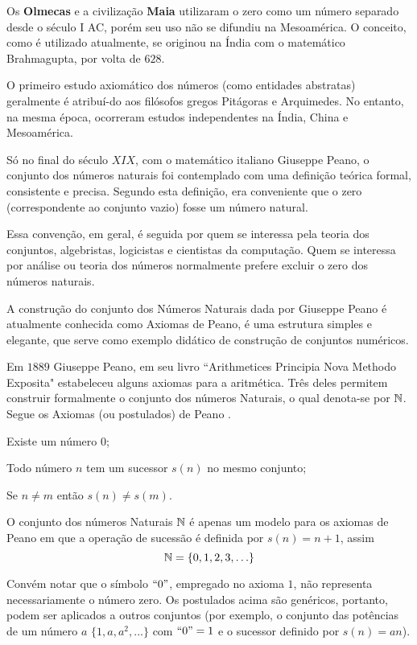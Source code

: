 \documentclass[glenn,refnum,codigo]{Estilo}
\begin{document}
Os \textbf{Olmecas} e a civilização \textbf{Maia} utilizaram o
zero como um número separado desde o século I AC, porém seu uso não
se difundiu na Mesoamérica. O conceito, como é  utilizado atualmente,
se originou na Índia com o matemático Brahmagupta, por volta de $628$.

O primeiro estudo axiomático dos números (como entidades abstratas)
geralmente é atribuí-do aos filósofos gregos Pitágoras e Arquimedes.
No entanto, na mesma época, ocorreram estudos independentes na Índia,
China e Mesoamérica.

Só no final do século $XIX$, com o matemático italiano Giuseppe Peano,
o conjunto dos números naturais foi contemplado com uma definição
teórica formal, consistente e precisa. Segundo esta definição, era
conveniente que o zero (correspondente ao conjunto vazio) fosse um
número natural.


Essa convenção, em geral, é seguida por quem se interessa pela
teoria dos conjuntos, algebristas, logicistas e cientistas da
computação. Quem se interessa por análise ou teoria dos números
normalmente prefere excluir o zero dos números naturais.

A construção do conjunto dos Números Naturais dada por Giuseppe Peano
é atualmente conhecida como Axiomas de Peano, é uma estrutura simples
e elegante, que serve como exemplo didático de construção de conjuntos
numéricos.

Em $1889$ Giuseppe Peano, em seu livro ``Arithmetices
Principia Nova Methodo Exposita"  estabeleceu alguns axiomas para
a aritmética. Três deles permitem cons\-truir formalmente o conjunto
dos números Naturais, o qual denota-se por $\mathbb{N}$. Segue os Axiomas
(ou postulados) de Peano
.


\begin{Lista}
	\item Existe um número 0;
	\item Todo número $n$ tem um sucessor $s(n)$ no mesmo conjunto;
	\item Se $n\neq{m}$ então $s(n)\neq{s(m)}$.
\end{Lista}

O conjunto dos números Naturais $\mathbb{N}$ é apenas um modelo para os axiomas
de Peano em que a operação de sucessão é definida por $s(n) = n + 1$, assim
\[
\mathbb{N} = \{0,1,2,3,\ldots\}
\]

Convém notar que o símbolo $``0"$, empregado no axioma
$1$, não representa necessariamente o número zero. Os postulados
acima são genéricos, portanto, podem ser aplicados a outros
conjuntos (por exemplo, o conjunto das potências de um número $a\,\,
\{1, a, a^2,...\}$ com $``0" = 1$ e o sucessor definido por $s(n) = a n$).
\end{document}
